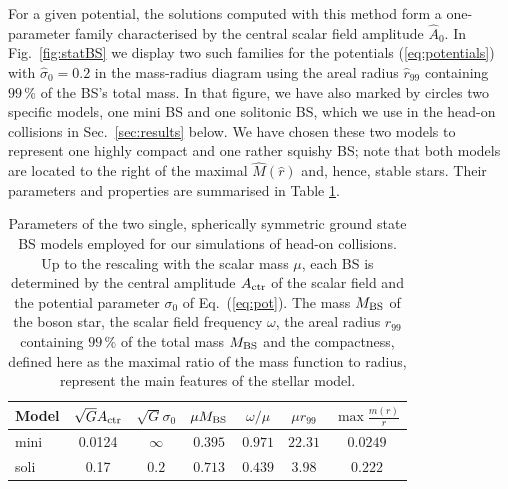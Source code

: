 \documentclass[]{iopart}
\begin{document}
For a given potential, the solutions computed with this method
form a one-parameter family characterised
by the central scalar field amplitude $\hat{A}_0$. In
Fig.~\ref{fig:statBS} we display two such families for the
potentials (\ref{eq:potentials}) with $\hat{\sigma}_0=0.2$ in the
mass-radius diagram using the areal radius $\hat{r}_{99}$ containing
$99\,\%$ of the BS's total mass. In that figure, we have also marked
by circles two specific models, one mini BS and one solitonic BS,
which we use in the head-on collisions in Sec.~\ref{sec:results} below.
We have chosen these two models to represent one highly compact and
one rather squishy BS; note that both models are located
to the right of the maximal $\hat{M}(\hat{r})$ and, hence, stable stars.
Their parameters and properties are summarised in Table
\ref{tab:models}.
%
\begin{table}
    \centering
    \begin{tabular}{l|cccccc}
    \hline
    Model & $\sqrt{G}A_{\rm ctr}$ & $\sqrt{G}\sigma_0$ & $\mu M_{\rm BS}$ & $\omega/\mu$ & $\mu r_{99}$ & $\max\frac{m(r)}{r}$  \\
    \hline
    mini & 0.0124 & $\infty$ & $0.395$ & $0.971$ & $22.31$ & $0.0249$ \\
    soli & 0.17 & $0.2$ & $0.713$ & $0.439$ & $3.98$ & $0.222$ \\
    \hline
    \end{tabular}
    \caption{Parameters of the two single, spherically symmetric
    ground state BS models employed for our simulations of
    head-on collisions. Up to the rescaling with the scalar mass
    $\mu$, each BS is determined by the central amplitude
    $A_{\rm ctr}$ of the scalar field and the potential parameter
    $\sigma_0$ of Eq.~(\ref{eq:pot}). The mass $M_{\rm BS}$ of the boson star,
    the scalar field frequency $\omega$, the areal radius $r_{99}$ containing
    $99\,\%$ of the total mass $M_{\rm BS}$ and the compactness, defined here
    as the maximal ratio of the mass function to radius, represent
    the main features of the stellar model.}
    \label{tab:models}
\end{table}
%
\end{document}
